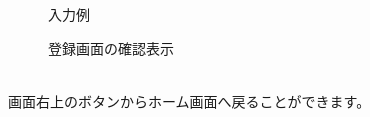 \documentclass[11ptm]{jsarticle}
\begin{document}
\begin{figure}[htbp]
  \centering
  \begin{minipage}[h]{0.6\linewidth}
    \centering
    \caption{\label{fig:入力例}入力例}
  \end{minipage}
  \hfill
  \begin{minipage}[h]{0.3\linewidth}
    \caption{\label{fig:登録画面の確認表示}登録画面の確認表示}
  \end{minipage}
\end{figure}\\
画面右上のボタンからホーム画面へ戻ることができます。
\end{document}
